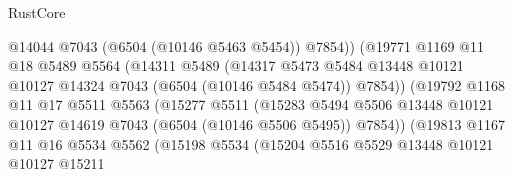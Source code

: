 \begin{lexlean}{RustCore}
\begin{coremodule}
                                      @14044
                                      @7043
                                      (@6504 (@10146 @5463 @5454))
                                      @7854))
                                  (@19771
                                    @1169
                                    @11
                                    @18
                                    @5489
                                    @5564
                                    (@14311
                                      @5489
                                      (@14317
                                        @5473
                                        @5484
                                        @13448
                                        @10121
                                        @10127
                                        @14324
                                        @7043
                                        (@6504 (@10146 @5484 @5474))
                                        @7854))
                                    (@19792
                                      @1168
                                      @11
                                      @17
                                      @5511
                                      @5563
                                      (@15277
                                        @5511
                                        (@15283
                                          @5494
                                          @5506
                                          @13448
                                          @10121
                                          @10127
                                          @14619
                                          @7043
                                          (@6504 (@10146 @5506 @5495))
                                          @7854))
                                      (@19813
                                        @1167
                                        @11
                                        @16
                                        @5534
                                        @5562
                                        (@15198
                                          @5534
                                          (@15204
                                            @5516
                                            @5529
                                            @13448
                                            @10121
                                            @10127
                                            @15211

\end{coremodule}
\end{lexlean}

